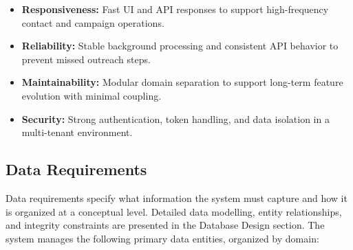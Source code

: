 \documentclass[a4paper]{article}
\begin{document}
\begin{itemize}
    \item \textbf{Responsiveness:} Fast UI and API responses to
    support high-frequency contact and campaign operations.
    \item \textbf{Reliability:} Stable background processing and
    consistent API behavior to prevent missed outreach steps.
    \item \textbf{Maintainability:} Modular domain separation to
    support long-term feature evolution with minimal coupling.
    \item \textbf{Security:} Strong authentication, token handling,
    and data isolation in a multi-tenant environment.
\end{itemize}



\subsection{Data Requirements}

Data requirements specify what information the system must capture
and how it is organized at a conceptual level. Detailed data
modelling, entity relationships, and integrity constraints are
presented in the Database Design section. The system manages the
following primary data entities, organized by domain:
\end{document}
